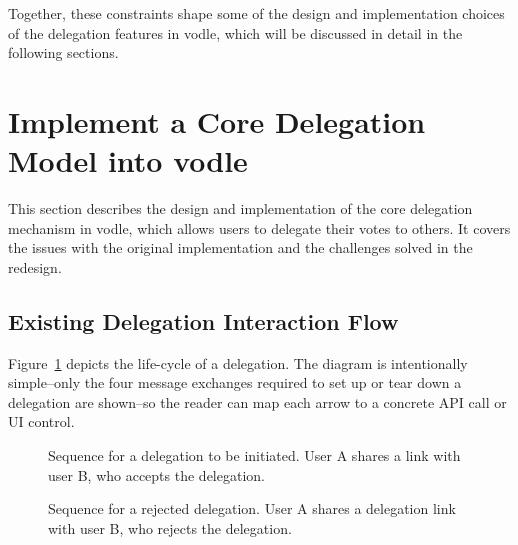 Together, these constraints shape some of the design and implementation choices of the delegation features in vodle, which will be discussed in detail in the following sections.

\section{Implement a Core Delegation Model into vodle}
\label{sec:core_delegation_detailed}
This section describes the design and implementation of the core delegation mechanism in vodle, which allows users to delegate their votes to others. It covers the issues with the original implementation and the challenges solved in the redesign.

\subsection{Existing Delegation Interaction Flow}
Figure~\ref{fig:delegation-flow-accept} depicts the life-cycle of a delegation. The diagram is intentionally simple--only the four message exchanges required to set up or tear down a delegation are shown--so the reader can map each arrow to a concrete API call or UI control.

\begin{figure}[H]
  \centering
  \caption{Sequence for a delegation to be initiated. User A shares a link with user B, who accepts the delegation.}
  \label{fig:delegation-flow-accept}
\end{figure}

\begin{figure}[H]
  \centering
  \caption{Sequence for a rejected delegation. User A shares a delegation link with user B, who rejects the delegation.}
  \label{fig:delegation-flow-reject}
\end{figure}

